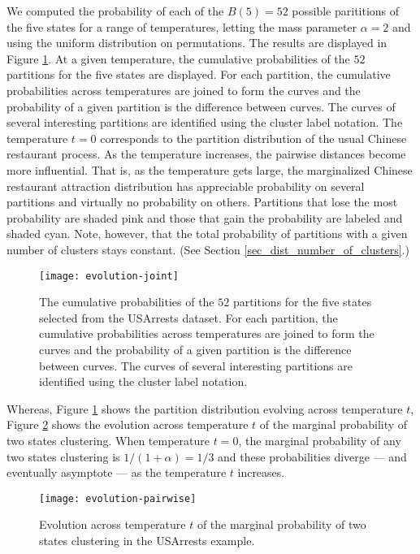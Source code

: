 \documentclass[lineno]{biometrika-dbd}
\newcommand{\mass}{\alpha}
\begin{document}
We computed the probability of each of the $B(5) = 52$ possible parititions of
the five states for a range of temperatures, letting the mass parameter
$\mass=2$ and using the uniform distribution on permutations.  The results are
displayed in Figure \ref{fig_evolution_joint}.  At a given temperature, the
cumulative probabilities of the $52$ partitions for the five states are
displayed.  For each partition, the cumulative probabilities across
temperatures are joined to form the curves and the probability of a given
partition is the difference between curves.  The curves of several interesting
partitions are identified using the cluster label notation.  The temperature
$t=0$ corresponds to the partition distribution of the usual Chinese restaurant
process.  As the temperature increases, the pairwise distances become more
influential.  That is, as the temperature gets large, the marginalized Chinese
restaurant attraction distribution has appreciable probability on several
partitions and virtually no probability on others.  Partitions that lose the
most probability are shaded pink and those that gain the probability are
labeled and shaded cyan.  Note, however, that the total probability of
partitions with a given number of clusters stays constant.  (See Section
\ref{sec_dist_number_of_clusters}.)

\begin{figure}[tb]
\centering\texttt{[image: evolution-joint]}
\caption{The cumulative probabilities of the $52$ partitions for the five
states selected from the USArrests dataset.  For each partition, the cumulative
probabilities across temperatures are joined to form the curves and the
probability of a given partition is the difference between curves.  The curves
of several interesting partitions are identified using the cluster label
notation.}
\label{fig_evolution_joint}
\end{figure}

Whereas, Figure \ref{fig_evolution_joint} shows the partition distribution
evolving across temperature $t$, Figure \ref{fig_evolution_pairwise} shows the
evolution across temperature $t$ of the marginal probability of two states
clustering.  When temperature $t=0$, the marginal probability of any two states
clustering is $1/(1+\mass) = 1/3$ and these probabilities diverge --- and
eventually asymptote --- as the temperature $t$ increases.

\begin{figure}[tb]
\centering\texttt{[image: evolution-pairwise]}
\caption{Evolution across temperature $t$ of the marginal probability of two states
clustering in the USArrests example.}
\label{fig_evolution_pairwise}
\end{figure}
\end{document}
